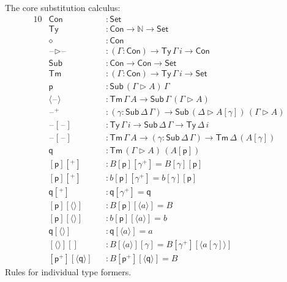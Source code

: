 \documentclass[a4paper,UKenglish]{article}
\newcommand{\ra}{\rightarrow}
\newcommand{\Set}{\mathsf{Set}}
\newcommand{\Ty}{\mathsf{Ty}}
\newcommand{\Tm}{\mathsf{Tm}}
\newcommand{\Con}{\mathsf{Con}}
\newcommand{\Sub}{\mathsf{Sub}}
\newcommand{\p}{\mathsf{p}}
\newcommand{\q}{\mathsf{q}}
\newcommand{\ext}{\mathop{\triangleright}}
\newcommand{\N}{\mathbb{N}}
\newcommand{\blank}{\mathord{\hspace{1pt}\text{--}\hspace{1pt}}} %
\begin{document}
The core substitution calculus:
\begin{alignat*}{10}
  & \Con && : \Set \\
  & \Ty && : \Con\ra\N\ra\Set \\
  & \diamond && : \Con \\
  & \blank\ext\blank && : (\Gamma:\Con)\ra\Ty\,\Gamma\,i\ra\Con \\
  & \Sub && : \Con\ra\Con\ra\Set \\
  & \Tm && : (\Gamma:\Con)\ra\Ty\,\Gamma\,i\ra\Set \\
  & \p && : \Sub\,(\Gamma\ext A)\,\Gamma \\
  & \langle\blank\rangle && : \Tm\,\Gamma\,A\ra\Sub\,\Gamma\,(\Gamma\ext A) \\
  & \blank^+ && : (\gamma:\Sub\,\Delta\,\Gamma)\ra\Sub\,(\Delta\ext A[\gamma])\,(\Gamma\ext A) \\
  & \blank[\blank] && : \Ty\,\Gamma\,i\ra\Sub\,\Delta\,\Gamma\ra\Ty\,\Delta\,i \\
  & \blank[\blank] && : \Tm\,\Gamma\,A\ra(\gamma:\Sub\,\Delta\,\Gamma)\ra\Tm\,\Delta\,(A[\gamma]) \\
  & \q && : \Tm\,(\Gamma\ext A)\,(A[\p]) \\
  & [\p][^+] && : B[\p][\gamma^+] = B[\gamma][\p] \\
  & [\p][^+] && : b[\p][\gamma^+] = b[\gamma][\p] \\
  & \q[^+] && : \q[\gamma^+] = \q \\
  & [\p][\langle\rangle] && : B[\p][\langle a\rangle] = B \\
  & [\p][\langle\rangle] && : b[\p ][\langle a\rangle] = b \\
  & \q[\langle\rangle] && : \q[\langle a\rangle] = a \\
  & [\langle\rangle][] && : B[\langle a\rangle][\gamma] = B[\gamma^+][\langle a[\gamma]\rangle] \\
  & [\p^+][\langle\q\rangle] && : B[\p^+][\langle\q\rangle] = B
\end{alignat*}
Rules for individual type formers.
\end{document}
